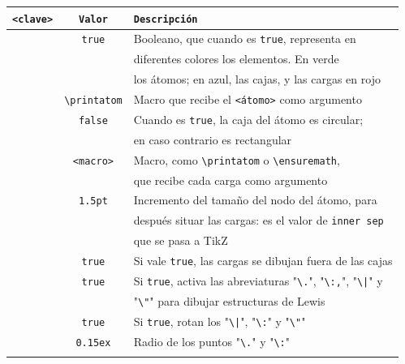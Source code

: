 {\small
\begin{center}
  \begin{longtable}{rcl}\hline
    \label{tbl:charge_claves}
    \texttt{<clave>} & \texttt{Valor} & \texttt{Descripción}\\\hline
    \texttt{\color{Blue}{debug}}
    & \texttt{true}
    & Booleano, que cuando es \texttt{true}, representa en\\&&
      diferentes colores los elementos. En verde\\&&
      los átomos; en azul, las cajas, y las cargas en rojo\\
    \texttt{\color{Blue}{macro atom}}
    & \texttt{\textbackslash printatom}
    & Macro que recibe el \texttt{<átomo>} como argumento\\
    \texttt{\color{Blue}{circle}}
    & \texttt{false}
    & Cuando es \texttt{true}, la caja del átomo es circular;\\&&
      en caso contrario es rectangular\\
 \texttt{\color{Blue}{macro charge}}
    & \texttt{<macro>}
    & Macro, como \texttt{\textbackslash printatom} o \texttt{\textbackslash ensuremath},
      \\&& que recibe cada carga como argumento\\
    \texttt{\color{Blue}{extra sep}}
    & \texttt{1.5pt}
    & Incremento del tamaño del nodo del átomo, para\\&& después situar las cargas: es
      el valor de \texttt{inner sep}\\&& que se pasa a \textsf{TikZ}\\
 \texttt{\color{Blue}{overlay}}
    & \texttt{true}
    & Si vale \texttt{true}, las cargas se dibujan fuera de las cajas\\
    \texttt{\color{Blue}{shortcuts}}
    & \texttt{true}
    & Si \texttt{true}, activa las abreviaturas "\texttt{\textbackslash.}", "\texttt{\textbackslash:,}", "\texttt{\textbackslash|}" y\\&& "\texttt{\textbackslash "}"
      para dibujar estructuras de Lewis\\
    \texttt{\color{Blue}{lewisautorot}}
    & \texttt{true}
    & Si \texttt{true}, rotan los "\texttt{\textbackslash|}", "\texttt{\textbackslash:}" y "\texttt{\textbackslash"}"\\
    \texttt{\color{Blue}{.radius}}
    & \texttt{0.15ex}
    & Radio de los puntos "\texttt{\textbackslash.}" y "\texttt{\textbackslash:}"\\
    \texttt{\color{Blue}{:sep}}

\end{longtable}
\end{center}}
